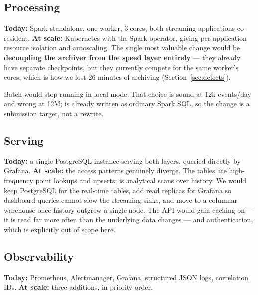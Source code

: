 \subsection{Processing}

\textbf{Today:} Spark standalone, one worker, 3 cores, both streaming
applications co-resident. \textbf{At scale:} Kubernetes with the Spark
operator, giving per-application resource isolation and autoscaling. The
single most valuable change would be \textbf{decoupling the archiver from
the speed layer entirely} --- they already have separate checkpoints, but
they currently compete for the same worker's cores, which is how we lost
26 minutes of archiving (Section~\ref{sec:defects}).

Batch would stop running in local mode. That choice is sound at 12k
events/day and wrong at 12M;  is already
written as ordinary Spark SQL, so the change is a submission target, not
a rewrite.

\subsection{Serving}

\textbf{Today:} a single PostgreSQL instance serving both layers, queried
directly by Grafana. \textbf{At scale:} the access patterns genuinely
diverge. The  tables are high-frequency point lookups and
upserts;  is analytical scans over history. We would keep
PostgreSQL for the real-time tables, add read replicas for Grafana so
dashboard queries cannot slow the streaming sinks, and move
 to a columnar warehouse once history
outgrew a single node. The API would gain caching on 
--- it is read far more often than the underlying data changes --- and
authentication, which is explicitly out of scope here.

\subsection{Observability}

\textbf{Today:} Prometheus, Alertmanager, Grafana, structured JSON logs,
correlation IDs. \textbf{At scale:} three additions, in priority order.

